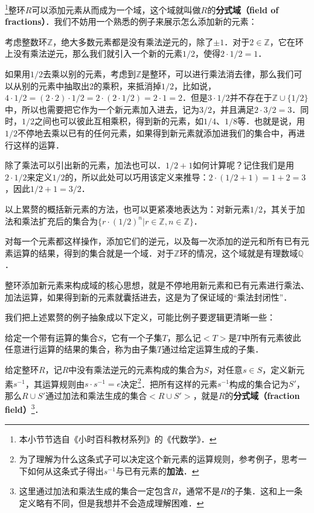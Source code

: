 



\footnote{本小节节选自《小时百科教材系列》的《代数学》．}整环$R$可以添加元素从而成为一个域，这个域就叫做$R$的\textbf{分式域（field of fractions）}．我们不妨用一个熟悉的例子来展示怎么添加新的元素：

\begin{example}{}
考虑整数环$\mathbb{Z}$，绝大多数元素都是没有乘法逆元的，除了$\pm 1$．对于$2\in\mathbb{Z}$，它在环上没有乘法逆元，那么我们就引入一个新的元素$1/2$，使得$2\cdot 1/2=1$．

如果用$1/2$去乘以别的元素，考虑到$\mathbb{Z}$是整环，可以进行乘法消去律，那么我们可以从别的元素中抽取出$2$的乘积，来抵消掉$1/2$，比如说，$4\cdot 1/2=(2\cdot 2)\cdot 1/2=2\cdot(2\cdot 1/2)=2\cdot 1=2$．但是$3\cdot 1/2$并不存在于$\mathbb{Z}\cup\{1/2\}$中，所以也需要把它作为一个新元素加入进去，记为$3/2$，并且满足$2\cdot 3/2=3$．同时，$1/2$之间也可以彼此互相乘积，得到新的元素，如$1/4$、$1/8$等．也就是说，用$1/2$不停地去乘以已有的任何元素，如果得到新元素就添加进我们的集合中，再进行这样的运算．

除了乘法可以引出新的元素，加法也可以．$1/2+1$如何计算呢？记住我们是用$2\cdot 1/2$来定义$1/2$的，所以此处可以巧用该定义来推导：$2\cdot(1/2+1)=1+2=3$，因此$1/2+1=3/2$．

以上累赘的概括新元素的方法，也可以更紧凑地表达为：对新元素$1/2$，其关于加法和乘法扩充后的集合为$\{r\cdot (1/2)^n|r\in\mathbb{Z}, n\in \mathbb{Z}\}$．

对每一个元素都这样操作，添加它们的逆元，以及每一次添加的逆元和所有已有元素运算的结果，得到的集合就是一个域．对于$\mathbb{Z}$环的情况，这个域就是有理数域$\mathbb{Q}$．
\end{example}

整环添加新元素来构成域的核心思想，就是不停地用新元素和已有元素进行乘法、加法运算，如果得到新的元素就囊括进去，这是为了保证域的“乘法封闭性”．

我们把上述累赘的例子抽象成以下定义，可能比例子要逻辑更清晰一些：

\begin{definition}{}
给定一个带有运算的集合$S$，它有一个子集$T$，那么记$<T>$是$T$中所有元素彼此任意进行运算的结果的集合，称为由子集$T$通过给定运算生成的子集．
\end{definition}

\begin{definition}{}
给定整环$R$，记$R$中没有乘法逆元的元素构成的集合为$S$，对任意$s\in S$，定义新元素$s^{-1}$，其运算规则由$s\cdot s^{-1}=e$决定\footnote{为了理解为什么这条式子可以决定这个新元素的运算规则，参考例子，思考一下如何从这条式子得出$s^{-1}$与已有元素的\textbf{加法}．}．把所有这样的元素$s^{-1}$构成的集合记为$S'$，那么$R\cup S'$通过加法和乘法生成的集合$<R\cup S'>$，就是$R$的\textbf{分式域（fraction field）}\footnote{这里通过加法和乘法生成的集合一定包含$R$，通常不是$R$的子集．这和上一条定义略有不同，但是我想并不会造成理解困难．}．
\end{definition}


